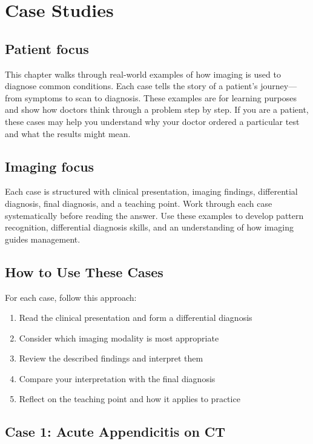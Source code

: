 \chapter{Case Studies}

\section*{Patient focus}
This chapter walks through real-world examples of how imaging is used to diagnose common conditions. Each case tells the story of a patient's journey---from symptoms to scan to diagnosis. These examples are for learning purposes and show how doctors think through a problem step by step. If you are a patient, these cases may help you understand why your doctor ordered a particular test and what the results might mean.

\section*{Imaging focus}
Each case is structured with clinical presentation, imaging findings, differential diagnosis, final diagnosis, and a teaching point. Work through each case systematically before reading the answer. Use these examples to develop pattern recognition, differential diagnosis skills, and an understanding of how imaging guides management.
\label{ch:ch98_cases}

\section{How to Use These Cases}
For each case, follow this approach:
\begin{enumerate}
    \item Read the clinical presentation and form a differential diagnosis
    \item Consider which imaging modality is most appropriate
    \item Review the described findings and interpret them
    \item Compare your interpretation with the final diagnosis
    \item Reflect on the teaching point and how it applies to practice
\end{enumerate}

\clearpage

\section{Case 1: Acute Appendicitis on CT}

